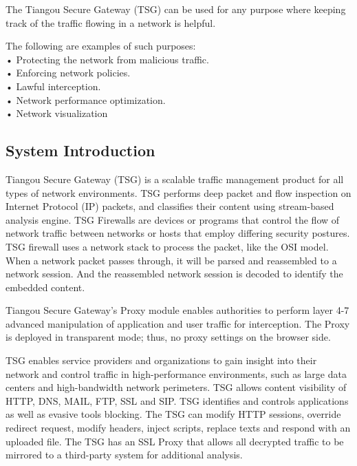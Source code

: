 The Tiangou Secure Gateway (TSG) can be used for any purpose where keeping track of the traffic flowing in a network is helpful.


The following are examples of such purposes:\\
• Protecting the network from malicious traffic.\\
• Enforcing network policies.\\
• Lawful interception.\\
• Network performance optimization.\\
• Network visualization

\subsection*{\hypertarget{link:System Introduction}{System Introduction}}
\label{sec:intro:overview:introduction}

Tiangou Secure Gateway (TSG) is a scalable traffic management product for all types of network environments. 
TSG performs deep packet and flow inspection on Internet Protocol (IP) packets, and classifies their content using stream-based analysis engine. 
TSG Firewalls are devices or programs that control the flow of network traffic between networks or hosts that employ differing security postures. 
TSG firewall uses a network stack to process the packet, like the OSI model. When a network packet passes through, it will be parsed and reassembled to a network session. 
And the reassembled network session is decoded to identify the embedded content.


Tiangou Secure Gateway’s Proxy module enables authorities to perform layer 4-7 advanced manipulation of application and user traffic for interception. 
The Proxy is deployed in transparent mode; thus, no proxy settings on the browser side.


TSG enables service providers and organizations to gain insight into their network and control traffic in high-performance environments, 
such as large data centers and high-bandwidth network perimeters. TSG allows content visibility of HTTP, DNS, MAIL, FTP, SSL and SIP. 
TSG identifies and controls applications as well as evasive tools blocking. The TSG can modify HTTP sessions, override redirect request, 
modify headers, inject scripts, replace texts and respond with an uploaded file. 
The TSG has an SSL Proxy that allows all decrypted traffic to be mirrored to a third-party system for additional analysis.



